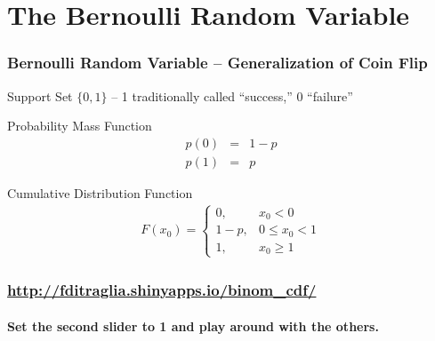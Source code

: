 \section{The Bernoulli Random Variable}
\begin{frame}
\frametitle{Bernoulli Random Variable -- Generalization of Coin Flip}
\small
\begin{block}{Support Set}
$\{0,1\}$ -- 1 traditionally called ``success,'' 0 ``failure''
\end{block}

\begin{block}{Probability Mass Function}
	\begin{eqnarray*}
		p(0) &=& 1-p\\
		p(1) &=& p
	\end{eqnarray*}

	\begin{block}{Cumulative Distribution Function}
\begin{eqnarray*}
	F(x_0) = \left\{\begin{array}{ll} 0,& x_0 < 0\\ 1-p, &0\leq x_0 < 1\\ 1,& x_0 \geq 1\end{array}\right.
\end{eqnarray*}
\end{block}
\end{block}

\end{frame}
\begin{frame}
	\frametitle{\href{http://fditraglia.shinyapps.io/binom_cdf/}{http://fditraglia.shinyapps.io/binom\_cdf/}}
\framesubtitle{Set the second slider to 1 and play around with the others.}

\begin{figure}
\end{figure}

\end{frame}


